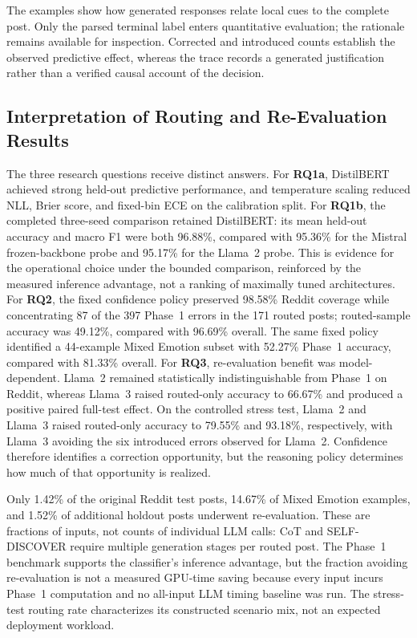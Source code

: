 \documentclass{ieeeaccess}
\begin{document}
The examples show how generated responses relate local cues to the complete post. Only the parsed terminal label enters quantitative evaluation; the rationale remains available for inspection. Corrected and introduced counts establish the observed predictive effect, whereas the trace records a generated justification rather than a verified causal account of the decision.

\subsection{Interpretation of Routing and Re-Evaluation Results}

The three research questions receive distinct answers. For \textbf{RQ1a}, DistilBERT achieved strong held-out predictive performance, and temperature scaling reduced NLL, Brier score, and fixed-bin ECE on the calibration split. For \textbf{RQ1b}, the completed three-seed comparison retained DistilBERT: its mean held-out accuracy and macro F1 were both 96.88\%, compared with 95.36\% for the Mistral frozen-backbone probe and 95.17\% for the Llama~2 probe. This is evidence for the operational choice under the bounded comparison, reinforced by the measured inference advantage, not a ranking of maximally tuned architectures. For \textbf{RQ2}, the fixed confidence policy preserved 98.58\% Reddit coverage while concentrating 87 of the 397 Phase~1 errors in the 171 routed posts; routed-sample accuracy was 49.12\%, compared with 96.69\% overall. The same fixed policy identified a 44-example Mixed Emotion subset with 52.27\% Phase~1 accuracy, compared with 81.33\% overall. For \textbf{RQ3}, re-evaluation benefit was model-dependent. Llama~2 remained statistically indistinguishable from Phase~1 on Reddit, whereas Llama~3 raised routed-only accuracy to 66.67\% and produced a positive paired full-test effect. On the controlled stress test, Llama~2 and Llama~3 raised routed-only accuracy to 79.55\% and 93.18\%, respectively, with Llama~3 avoiding the six introduced errors observed for Llama~2. Confidence therefore identifies a correction opportunity, but the reasoning policy determines how much of that opportunity is realized.

Only 1.42\% of the original Reddit test posts, 14.67\% of Mixed Emotion examples, and 1.52\% of additional holdout posts underwent re-evaluation. These are fractions of inputs, not counts of individual LLM calls: CoT and SELF-DISCOVER require multiple generation stages per routed post. The Phase~1 benchmark supports the classifier's inference advantage, but the fraction avoiding re-evaluation is not a measured GPU-time saving because every input incurs Phase~1 computation and no all-input LLM timing baseline was run. The stress-test routing rate characterizes its constructed scenario mix, not an expected deployment workload.
\end{document}
